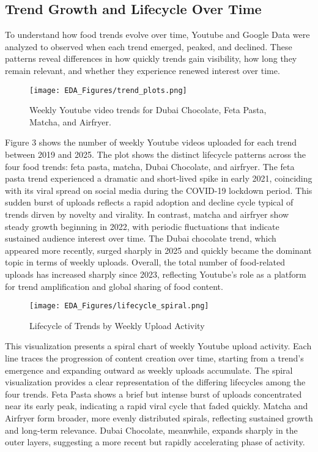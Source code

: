 \documentclass{article}
\begin{document}
\subsection{Trend Growth and Lifecycle Over Time}
To understand how food trends evolve over time, Youtube and Google Data were analyzed to observed when each trend emerged, peaked, and declined. These patterns reveal differences in how quickly trends gain visibility, how long they remain relevant, and whether they experience renewed interest over time.

\begin{figure}[H]
    \centering
    \texttt{[image: EDA\_Figures/trend\_plots.png]}
    \caption{Weekly Youtube video trends for Dubai Chocolate, Feta Pasta, Matcha, and Airfryer.}
    \label{fig:trend_plots}
\end{figure}

Figure 3 shows the number of weekly Youtube videos uploaded for each trend between 2019 and 2025. The plot shows the distinct lifecycle patterns across the four food trends: feta pasta, matcha, Dubai Chocolate, and airfryer. The feta pasta trend experienced a dramatic and short-lived spike in early 2021, coinciding with its viral spread on social media during the COVID-19 lockdown period. This sudden burst of uploads reflects a rapid adoption and decline cycle typical of trends dirven by novelty and virality. In contrast, matcha and airfryer show steady growth beginning in 2022, with periodic fluctuations that indicate sustained audience interest over time. The Dubai chocolate trend, which appeared more recently, surged sharply in 2025 and quickly became the dominant topic in terms of weekly uploads. Overall, the total number of food-related uploads has increased sharply since 2023, reflecting Youtube's role as a platform for trend amplification and global sharing of food content. 

\begin{figure}[H]
    \centering
    \texttt{[image: EDA\_Figures/lifecycle\_spiral.png]}
    \caption{Lifecycle of Trends by Weekly Upload Activity}
    \label{fig:lifecycle_spiral}
\end{figure}

This visualization presents a spiral chart of weekly Youtube upload activity. Each line traces the progression of content creation over time, starting from a trend's emergence and expanding outward as weekly uploads accumulate. The spiral visualization provides a clear representation of the differing lifecycles among the four trends. Feta Pasta shows a brief but intense burst of uploads concentrated near its early peak, indicating a rapid viral cycle that faded quickly. Matcha and Airfryer form broader, more evenly distributed spirals, reflecting sustained growth and long-term relevance. Dubai Chocolate, meanwhile, expands sharply in the outer layers, suggesting a more recent but rapidly accelerating phase of activity.
\end{document}
